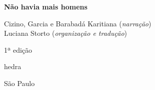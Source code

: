 




\begingroup\thispagestyle{empty}\vspace*{.05\textheight} 

              {\formular
              \huge
              \noindent
              \textbf{Não havia mais homens}\\
              
              \vspace{-0.5cm}
              
              }



              \vspace{1cm}
              

              \vfill              

              {\small
              \noindent{}Cizino, Garcia e Barabadá Karitiana (\textit{narração})\vspace{0.2cm}\\
              \noindent{}Luciana Storto (\textit{organização e tradução})
              }

              \vspace{0.5cm}

              {\small\noindent{}1ª edição}

              \vfill
              \newfontfamily{}
              {\noindent\fontsize{30}{40}\selectfont \timesnewroman hedra}

              {\selectfont\small\noindent São Paulo \quad\the\year}

\endgroup
\pagebreak
